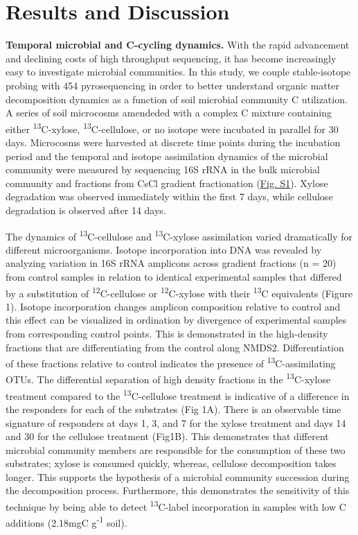 \section{Results and Discussion}


\textbf{Temporal microbial and C-cycling dynamics.} With the rapid advancement and declining costs of high throughput sequencing, it has become increasingly easy to investigate microbial communities. In this study, we couple stable-isotope probing with 454 pyrosequencing in order to better understand organic matter decomposition dynamics as a function of soil microbial community C utilization. A series of soil microcosms amendeded with a complex C mixture containing either \textsuperscript{13}C-xylose, \textsuperscript{13}C-cellulose, or no isotope were incubated in parallel for 30 days. Microcosms were harvested at discrete time points during the incubation period and the temporal and isotope assimilation dynamics of the microbial community were measured by sequencing 16S rRNA in the bulk microbial community and fractions from CsCl gradient fractionation (\href{https://www.authorea.com/users/3537/articles/8459/master/file/figures/20140708_ConceptualFig2/20140708_ConceptualFig2.pdf}{Fig. S1}). Xylose degradation was observed immediately within the first 7 days, while cellulose degradation is observed after 14 days. 


The dynamics of \textsuperscript{13}C-cellulose and \textsuperscript{13}C-xylose assimilation varied dramatically for different microorganisms. Isotope incorporation into DNA was revealed by analyzing variation in 16S rRNA amplicons across gradient fractions (n = 20) from control samples in relation to identical experimental samples that differed by a substitution of \textsuperscript{12}C-cellulose or \textsuperscript{12}C-xylose with their \textsuperscript{13}C equivalents (Figure 1). Isotope incorporation changes amplicon composition relative to control and this effect can be visualized in ordination by divergence of experimental samples from corresponding control points. This is demonstrated in the high-density fractions that are differentiating from the control along NMDS2. Differentiation of these fractions relative to control indicates the presence of \textsuperscript{13}C-assimilating OTUs. The differential separation of high density fractions in the \textsuperscript{13}C-xylose treatment compared to the \textsuperscript{13}C-cellulose treatment is indicative of a difference in the responders for each of the substrates (Fig 1A). There is an observable time signature of responders at days 1, 3, and 7 for the xylose treatment and days 14 and 30 for the cellulose treatment (Fig1B). This demonstrates that different microbial community members are responsible for the consumption of these two substrates; xylose is consumed quickly, whereas, cellulose decomposition takes longer. This supports the hypothesis of a microbial community succession during the decomposition process. Furthermore, this demonstrates the sensitivity of this technique by being able to detect \textsuperscript{13}C-label incorporation in samples with low C additions (2.18mgC g\textsuperscript{-1} soil).    


